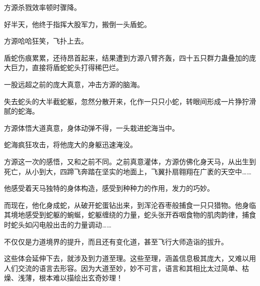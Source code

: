 \begin{this_body}
方源杀戮效率顿时骤降。

好半天，他终于指挥大股军力，搬倒一头盾蛇。

方源哈哈狂笑，飞扑上去。

盾蛇伤痕累累，还待昂首起来，结果遭到方源八臂齐轰，四十五只群力蛊叠加的庞大巨力，直接将盾蛇蛇头打得稀巴烂。

一股远超之前的庞大真意，冲击方源的脑海。

失去蛇头的大半截蛇躯，忽然分散开来，化作一只只小蛇，转眼间形成一片狰狞滑腻的蛇海。

方源体悟大道真意，身体动弹不得，一头栽进蛇海当中。

蛇海疯狂攻击，将他庞大的身躯迅速淹没。

方源这一次的感悟，又和之前不同。之前真意灌体，方源仿佛化身天马，从出生到死亡，从小到大，四蹄飞奔踏在坚实的地面上，飞翼扑扇翱翔在广袤的天空中……

他感受着天马独特的身体构造，感受到种种力的作用，发力的巧妙。

而现在，他化身成蛇，从破开蛇蛋钻出来，到浑沦吞枣般捕食一只只猎物。他身临其境地感受到蛇躯的蜿蜒，蛇躯缠绕的力量，蛇头张开吞咽食物的肌肉韵律，捕食时蛇头如闪电般出击的力量调动……

不仅仅是力道境界的提升，而且还有变化道，甚至飞行大师造诣的拔升。

这些体会延伸下去，就涉及到力道至理。这些至理，涵盖信息极其庞大，又难以用人们交流的语言去形容。因为大道至妙，妙不可言，语言和其相比太过简单、枯燥、浅薄，根本难以描绘出玄奇妙理！

\end{this_body}

